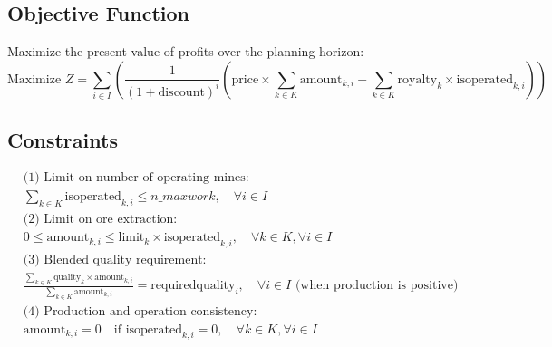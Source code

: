 \documentclass{article}
\begin{document}
\subsection*{Objective Function}
Maximize the present value of profits over the planning horizon:
\[
\text{Maximize } Z = \sum_{i \in I} \left( \frac{1}{(1 + \text{discount})^i} \left( \text{price} \times \sum_{k \in K} \text{amount}_{k,i} - \sum_{k \in K} \text{royalty}_k \times \text{isoperated}_{k,i} \right) \right)
\]

\subsection*{Constraints}
\begin{align*}
&\text{(1) Limit on number of operating mines:} \\
&\sum_{k \in K} \text{isoperated}_{k,i} \leq n\_maxwork, \quad \forall i \in I \\
&\text{(2) Limit on ore extraction:} \\
&0 \leq \text{amount}_{k,i} \leq \text{limit}_k \times \text{isoperated}_{k,i}, \quad \forall k \in K, \forall i \in I \\
&\text{(3) Blended quality requirement:} \\
&\frac{\sum_{k \in K} \text{quality}_k \times \text{amount}_{k,i}}{\sum_{k \in K} \text{amount}_{k,i}} = \text{requiredquality}_i, \quad \forall i \in I \text{ (when production is positive)}\\
&\text{(4) Production and operation consistency:} \\
&\text{amount}_{k,i} = 0 \quad \text{if } \text{isoperated}_{k,i} = 0, \quad \forall k \in K, \forall i \in I \\
\end{align*}
\end{document}
